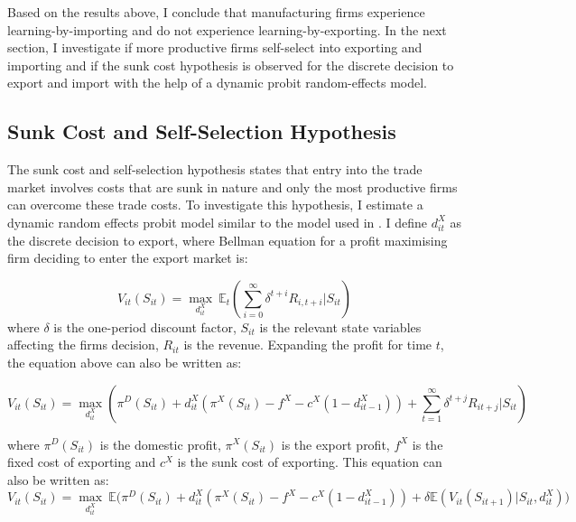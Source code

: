 \documentclass[12pt]{article}
\begin{document}
Based on the results above,  I conclude that manufacturing firms experience learning-by-importing and
do not experience learning-by-exporting. 
In the next section, I investigate if more productive firms self-select into
exporting and importing and if the sunk cost hypothesis is observed for
the discrete decision to export and import with the help of a dynamic probit
random-effects model. 

\subsection{Sunk Cost and Self-Selection Hypothesis }\label{sec:ss}
The sunk cost and self-selection hypothesis states that entry into the trade market
involves costs that are sunk in nature and only the most productive firms can
overcome these trade costs. To investigate this hypothesis, I
estimate a dynamic random effects probit model similar to the model used
in \textcite{roberts1997decision}. I define $d_{it}^{X}$ as the discrete
decision to export, where
 Bellman equation for a profit maximising firm deciding to enter the
 export market is:

 
\begin{equation}
V_{it}(S_{it})= \underset{d_{it}^{X}}{\max}\:  \mathbb{E}_{t}(\sum_{i=0}^{\infty} \delta^{t+i}R_{i,t+i}|S_{it})
\end{equation}
 where $\delta$ is the one-period discount factor, $S_{it}$ is the
 relevant state variables affecting the firms decision, $R_{it}$ is
 the revenue. Expanding the profit for time $t$, the equation above can also be written as:
 
\begin{equation}
V_{it}(S_{it})= \underset{d_{it}^{X}}{\max} (\pi^{D}(S_{it}) + d_{it}^{X}(\pi^{X}(S_{it})- f^{X} -
c^{X}(1-d_{it-1}^{X}))  + \sum_{t=1}^{\infty} \delta^{t+j}R_{it+j}|S_{it})
\end{equation}

where $\pi^{D}(S_{it})$ is the domestic profit, $\pi^{X}(S_{it})$ is the export
profit, $f^{X}$ is the fixed cost of exporting and $c^{X}$ is the sunk
cost of exporting. This equation can also be written as:
\begin{equation}
V_{it}(S_{it})= \underset{d_{it}^{X}}{\max} \:\mathbb{E}
\Big(\pi^{D}(S_{it}) + d_{it}^{X}(\pi^{X}(S_{it}) - f^{X} -
c^{X}(1-d_{it-1}^{X}))  + \delta \mathbb{E} (V_{it}(S_{it+1})|S_{it},
d_{it}^{X}) \Big)
\end{equation}
\end{document}
